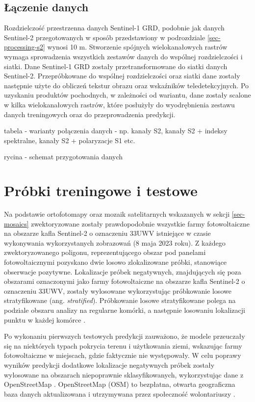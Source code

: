 \documentclass{amuthesis}
\begin{document}
\hypertarget{sec-processing-data-merging}{%
\subsection{Łączenie danych}\label{sec-processing-data-merging}}

Rozdzielczość przestrzenna danych Sentinel-1 GRD, podobnie jak danych
Sentinel-2 przegotowanych w sposób przedstawiony w podrozdziale
\ref{sec-processing-s2} wynosi 10 m. Stworzenie spójnych wielokanałowych
rastrów wymaga sprowadzenia wszystkich zestawów danych do wspólnej
rozdzielczości i siatki. Dane Sentinel-1 GRD zostały przetransformowane
do siatki danych Sentinel-2. Przepróbkowane do wspólnej rozdzielczości
oraz siatki dane zostały następnie użyte do obliczeń tekstur obrazu oraz
wskaźników teledetekcyjnych. Po uzyskaniu produktów pochodnych, w
zależności od wariantu, dane zostały scalone w kilka wielokanałowych
rastrów, które posłużyły do wyodrębnienia zestawu danych treningowych
oraz do przeprowadzenia predykcji.

tabela - warianty połączenia danych - np. kanały S2, kanały S2 + indeksy
spektralne, kanały S2 + polaryzacje S1 etc.

rycina - schemat przygotowania danych

\hypertarget{sec-samples-methods}{%
\section{Próbki treningowe i testowe}\label{sec-samples-methods}}

Na podstawie ortofotomapy oraz mozaik satelitarnych wskazanych w sekcji
\ref{sec-mosaics} zwektoryzowane zostały prawdopodobnie wszystkie farmy
fotowoltaiczne na obszarze kafla Sentinel-2 o oznaczeniu 33UWV
istniejące w czasie wykonywania wykorzystanych zobrazowań (8 maja 2023
roku). Z każdego zwektoryzowanego poligonu, reprezentującego obszar pod
panelami fotowoltaicznymi pozyskano dwie losowo zlokalizowane próbki,
stanowiące obserwacje pozytywne. Lokalizacje próbek negatywnych,
znajdujących się poza obszarami oznaczonymi jako farmy fotowoltaiczne na
obszarze kafla Sentinel-2 o oznaczeniu 33UWV, zostały wylosowane
wykorzystując próbkowanie losowe stratyfikowane (ang.
\emph{stratified}). Próbkowanie losowe stratyfikowane polega na podziale
obszaru analizy na regularne komórki, a następnie losowaniu lokalizacji
punktu w każdej komórce \autocite{nowosad_2021_geostatystyka_r}.

Po wykonaniu pierwszych testowych predykcji zauważono, że modele
przeuczały się na niektórych typach pokrycia terenu i użytkowania ziemi,
wskazując farmy fotowoltaiczne w miejscach, gdzie faktycznie nie
występowały. W celu poprawy wyników predykcji dodatkowe lokalizacje
negatywnych próbek zostały wylosowane na obszarach niepoprawnie
sklasyfikowanych, wykorzystując dane z OpenStreetMap
\autocite{OpenStreetMap}. OpenStreetMap (OSM) to bezpłatna, otwarta
geograficzna baza danych aktualizowana i utrzymywana przez społeczność
wolontariuszy \autocite{bennett_2010_openstreetmap}.
\end{document}
